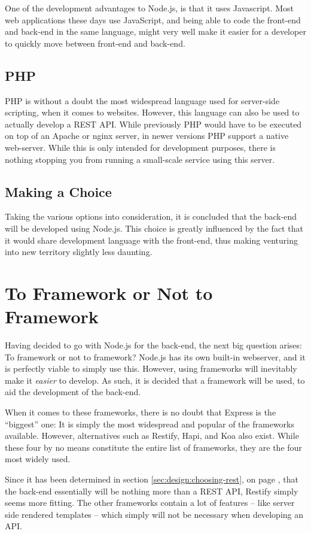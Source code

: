 			One of the development advantages to Node.js, is that it uses Javascript. Most web applications these days use JavaScript, and being able to code the front-end and back-end in the same language, might very well make it easier for a developer to quickly move between front-end and back-end.

		\subsection{PHP}
			PHP is without a doubt the most widespread language used for server-side scripting, when it comes to websites. However, this language can also be used to actually develop a REST API. While previously PHP would have to be executed on top of an Apache or nginx server, in newer versions PHP support a native web-server. While this is only intended for development purposes, there is nothing stopping you from running a small-scale service using this server.

		\subsection{Making a Choice}
			Taking the various options into consideration, it is concluded that the back-end will be developed using Node.js. This choice is greatly influenced by the fact that it would share development language with the front-end, thus making venturing into new territory slightly less daunting.

	\section{To Framework or Not to Framework}
		Having decided to go with Node.js for the back-end, the next big question arises: To framework or not to framework? Node.js has its own built-in webserver, and it is perfectly viable to simply use this. However, using frameworks will inevitably make it \emph{easier} to develop. As such, it is decided that a framework will be used, to aid the development of the back-end.

		When it comes to these frameworks, there is no doubt that Express is the ``biggest'' one: It is simply the most widespread and popular of the frameworks available. However, alternatives such as Restify, Hapi, and Koa also exist. While these four by no means constitute the entire list of frameworks, they are the four most widely used.

		Since it has been determined in section \ref{sec:design:choosing-rest}, on page \pageref{sec:design:choosing-rest}, that the back-end essentially will be nothing more than a REST API, Restify simply seems more fitting. The other frameworks contain a lot of features -- like server side rendered templates -- which simply will not be necessary when developing an API. 

